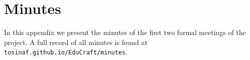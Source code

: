 \chapter{Minutes}
\label{apdx:minutes}

In this appendix we present the minutes of the first two formal
meetings of the project. A full record of all minutes is found
at \texttt{tosinaf.github.io/EduCraft/minutes}.



